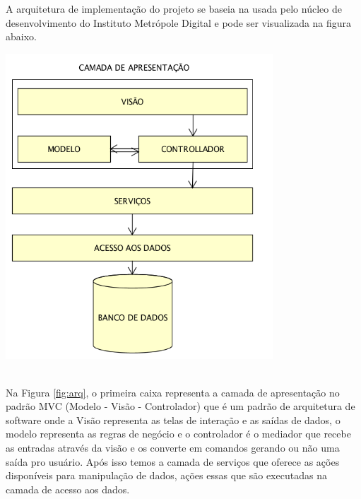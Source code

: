 A arquitetura de implementação do projeto se baseia na usada pelo núcleo de desenvolvimento do Instituto Metrópole Digital e pode ser visualizada na figura abaixo.

\vspace{5mm}
\begin{minipage}[c]{\textwidth}
	\centering
    \includegraphics[width=10cm]{Imagens/Arquitetura.png}
	\label{fig:arq}
\end{minipage} \\

Na Figura \hyperref[fig:arq]{\ref{fig:arq}}, o primeira caixa representa a camada de apresentação no padrão MVC (Modelo - Visão - Controlador) que é um padrão de arquitetura de software onde a Visão representa as telas de interação e as saídas de dados, o modelo representa as regras de negócio e o controlador é o mediador que recebe as entradas através da visão e os converte em comandos gerando ou não uma saída pro usuário. Após isso temos a camada de serviços que oferece as ações disponíveis para manipulação de dados, ações essas que são executadas na camada de acesso aos dados.
